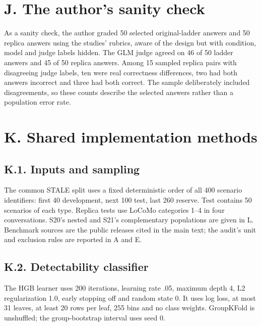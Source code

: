 \documentclass[11pt]{article}
\begin{document}
\endgroup

\label{appendix-j}

\section{J. The author's sanity check}\label{j.-the-authors-sanity-check}

As a sanity check, the author graded 50 selected original-ladder answers and 50 replica answers using the studies' rubrics, aware of the design but with condition, model and judge labels hidden. The GLM judge agreed on 46 of 50 ladder answers and 45 of 50 replica answers. Among 15 sampled replica pairs with disagreeing judge labels, ten were real correctness differences, two had both answers incorrect and three had both correct. The sample deliberately included disagreements, so these counts describe the selected answers rather than a population error rate.

\label{appendix-k}

\section{K. Shared implementation methods}\label{k.-shared-implementation-methods}

\label{appendix-k1}

\subsection{K.1. Inputs and sampling}\label{k.1.-inputs-and-sampling}

The common STALE split uses a fixed deterministic order of all 400 scenario identifiers: first 40 development, next 100 test, last 260 reserve. Test contains 50 scenarios of each type. Replica tests use LoCoMo categories 1--4 in four conversations. S20's nested and S21's complementary populations are given in L. Benchmark sources are the public releases cited in the main text; the audit's unit and exclusion rules are reported in A and E.

\label{appendix-k2}

\subsection{K.2. Detectability classifier}\label{k.2.-detectability-classifier}

The HGB learner uses 200 iterations, learning rate .05, maximum depth 4, L2 regularization 1.0, early stopping off and random state 0. It uses log loss, at most 31 leaves, at least 20 rows per leaf, 255 bins and no class weights. GroupKFold is unshuffled; the group-bootstrap interval uses seed 0.
\end{document}
